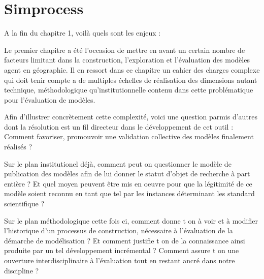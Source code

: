 
\graphicspath{{Figure2/}}

\chapter{Simprocess}

\startcontents[chapters]
\Mprintcontents

A la fin du chapitre 1, voilà quels sont les enjeux :


Le premier chapitre a été l’occasion de mettre en avant un certain nombre de facteurs limitant dans la construction, l'exploration et l'évaluation des modèles agent en géographie. Il en ressort dans ce chapitre un cahier des charges complexe qui doit tenir compte a de multiples échelles de réalisation des dimensions autant technique, méthodologique qu’institutionnelle contenu dans cette problématique pour l'évaluation de modèles.

Afin d'illustrer concrètement cette complexité, voici une question parmis d'autres dont la résolution est un fil directeur dans le développement de cet outil : Comment favoriser, promouvoir une validation collective des modèles finalement réalisés ?

Sur le plan institutionel déjà, comment peut on questionner le modèle de publication des modèles afin de lui donner le statut d'objet de recherche à part entière ?  Et quel moyen peuvent être mis en oeuvre pour que la légitimité de ce modèle soient reconnu en tant que tel par les instances déterminant les standard scientifique ? 

Sur le plan méthodologique cette fois ci, comment donne t on à voir et à modifier l'historique d'un processus de construction, nécessaire à l'évaluation de la démarche de modélisation ? Et comment justifie t on de la connaissance ainsi produite par un tel développement incrémental ? Comment assure t on une ouverture interdisciplinaire à l'évaluation tout en restant ancré dans notre discipline ?

